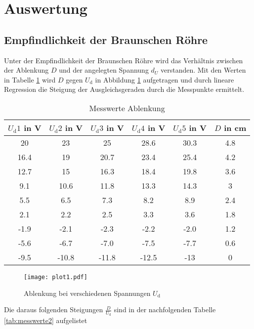 \section{Auswertung}
\label{sec:Auswertung}

\subsection{Empfindlichkeit der Braunschen Röhre}
\label{sec:Empfindlichkeit}
Unter der Empfindlichkeit der Braunschen Röhre wird das Verhältnis zwischen der Ablenkung $D$ und der angelegten Spannung $d_U$ verstanden.
Mit den Werten in Tabelle \ref{tab:messwerte1} wird $D$ gegen $U_\text{d}$ in Abbildung \ref{fig:plot1} aufgetragen und durch lineare Regression die Steigung der Ausgleichsgeraden durch die Messpunkte ermittelt.

\FloatBarrier
\begin{table}
  \centering
  \caption{Messwerte Ablenkung}
  \label{tab:messwerte1}
  \begin{tabular}{c c c c c c}
  \toprule
  $U_\text{d} 1$ in V & $U_\text{d} 2$ in V & $U_\text{d} 3$ in V & $U_\text{d} 4$ in V & $U_\text{d} 5$ in V & $D$ in cm \\
  \midrule
  20 & 23 & 25 & 28.6 & 30.3 & 4.8 \\
  16.4 & 19 & 20.7 & 23.4 & 25.4 & 4.2 \\
  12.7 & 15 & 16.3 & 18.4 & 19.8 & 3.6 \\
  9.1 & 10.6 & 11.8 & 13.3 & 14.3 & 3 \\
  5.5 & 6.5 & 7.3 & 8.2 & 8.9 & 2.4 \\
  2.1 & 2.2 & 2.5 & 3.3 & 3.6 & 1.8 \\
  -1.9 & -2.1 & -2.3 & -2.2 & -2.0 & 1.2 \\
  -5.6 & -6.7 & -7.0 & -7.5 & -7.7 & 0.6 \\
  -9.5 & -10.8 & -11.8 & -12.5 & -13 & 0 \\
  \bottomrule
\end{tabular}
\end{table}

\FloatBarrier
\begin{figure}
  \centering
  \texttt{[image: plot1.pdf]}
  \caption{Ablenkung bei verschiedenen Spannungen $U_\text{d}$}
  \label{fig:plot1}
\end{figure}

\noindent
Die daraus folgenden Steigungen $\frac{D}{U_\text{d}}$ sind in der nachfolgenden Tabelle \ref{tab:messwerte2} aufgelistet

